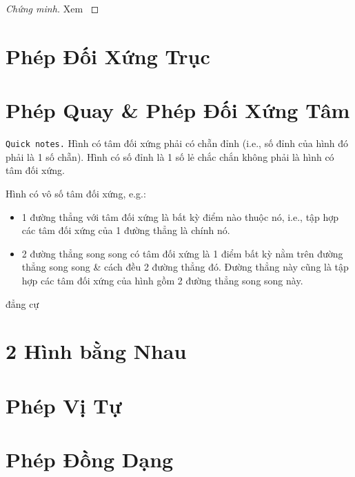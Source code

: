 \documentclass[oneside]{book}
\numberwithin{equation}{section}
\begin{document}
\begin{proof}[Chứng minh]
	Xem \cite[p. 7]{TL_chuyen_Toan_Hinh_Hoc_11}
\end{proof}


\section{Phép Đối Xứng Trục}


\section{Phép Quay \& Phép Đối Xứng Tâm}
\texttt{Quick notes.} Hình có tâm đối xứng phải có chẵn đỉnh (i.e., số đỉnh của hình đó phải là 1 số chẵn). Hình có số đỉnh là 1 số lẻ chắc chắn không phải là hình có tâm đối xứng.

Hình có vô số tâm đối xứng, e.g.:
\begin{itemize}
	\item 1 đường thẳng với tâm đối xứng là bất kỳ điểm nào thuộc nó, i.e., tập hợp các tâm đối xứng của 1 đường thẳng là chính nó. 
	\item 2 đường thẳng song song có tâm đối xứng là 1 điểm bất kỳ nằm trên đường thẳng song song \& cách đều 2 đường thẳng đó. Đường thẳng này cũng là tập hợp các tâm đối xứng của hình gồm 2 đường thẳng song song này.
\end{itemize}

đẳng cự


\section{2 Hình bằng Nhau}


\section{Phép Vị Tự}


\section{Phép Đồng Dạng}
\end{document}
